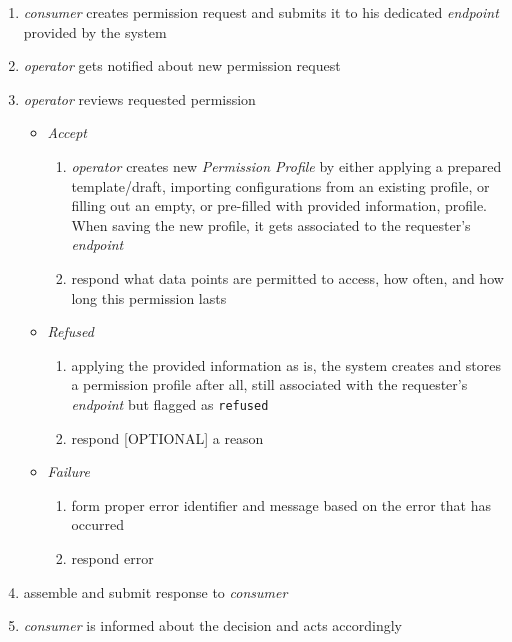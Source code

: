 \documentclass[12pt,english,a4paper,titlepage,cleardoublepage=empty,dottedtoc]{report}
\providecommand{\tightlist}{%
  \setlength{\itemsep}{0pt}\setlength{\parskip}{0pt}}
\begin{document}
\begin{enumerate}
\def\labelenumi{\arabic{enumi}.}
\item
  \emph{consumer} creates permission request and submits it to his
  dedicated \emph{endpoint} provided by the system
\item
  \emph{operator} gets notified about new permission request
\item
  \emph{operator} reviews requested permission

  \begin{itemize}
  \tightlist
  \item
    \emph{Accept}

    \begin{enumerate}
    \def\labelenumii{\arabic{enumii})}
    \tightlist
    \item
      \emph{operator} creates new \emph{Permission Profile} by either
      applying a prepared template/draft, importing configurations from
      an existing profile, or filling out an empty, or pre-filled with
      provided information, profile. When saving the new profile, it
      gets associated to the requester's \emph{endpoint}
    \item
      respond what data points are permitted to access, how often, and
      how long this permission lasts
    \end{enumerate}
  \item
    \emph{Refused}

    \begin{enumerate}
    \def\labelenumii{\arabic{enumii})}
    \tightlist
    \item
      applying the provided information as is, the system creates and
      stores a permission profile after all, still associated with the
      requester's \emph{endpoint} but flagged as \texttt{refused}
    \item
      respond {[}OPTIONAL{]} a reason
    \end{enumerate}
  \item
    \emph{Failure}

    \begin{enumerate}
    \def\labelenumii{\arabic{enumii})}
    \tightlist
    \item
      form proper error identifier and message based on the error that
      has occurred
    \item
      respond error
    \end{enumerate}
  \end{itemize}
\item
  assemble and submit response to \emph{consumer}
\item
  \emph{consumer} is informed about the decision and acts accordingly


\end{enumerate}
\end{document}
